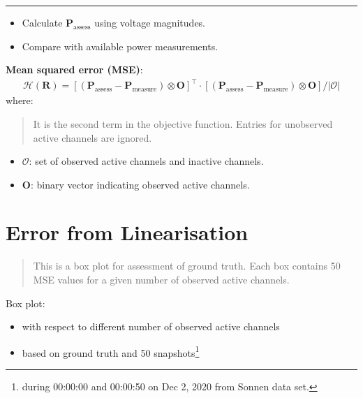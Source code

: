 \documentclass[
]{book}
\providecommand{\tightlist}{%
  \setlength{\itemsep}{0pt}\setlength{\parskip}{0pt}}
\begin{document}
\begin{center}\rule{0.5\linewidth}{0.5pt}\end{center}

\begin{itemize}
\tightlist
\item
  Calculate \(\boldsymbol{P}_\text{assess}\) using voltage magnitudes.
\item
  Compare with available power measurements.
\end{itemize}

\textbf{Mean squared error (MSE)}:
\[ \begin{aligned}
  \mathcal{H}(\boldsymbol{R}) =
  \left[
    (\boldsymbol{P}_\text{assess} - \boldsymbol{P}_\text{measure})
    \otimes \boldsymbol{O}
  \right]^\top
  \cdot \left[
    (\boldsymbol{P}_\text{assess} - \boldsymbol{P}_\text{measure})
    \otimes \boldsymbol{O}
  \right]
  / |\mathcal{O}|
\end{aligned} \]
where:

\begin{quote}
It is the second term in the objective function. Entries for unobserved
active channels are ignored.
\end{quote}

\begin{itemize}
\tightlist
\item
  \(\mathcal{O}\): set of observed active channels and inactive channels.
\item
  \(\boldsymbol{O}\): binary vector indicating observed active channels.
\end{itemize}

\hypertarget{error}{%
\section{Error from Linearisation}\label{error}}

\begin{quote}
This is a box plot for assessment of ground truth. Each box contains 50 MSE
values for a given number of observed active channels.
\end{quote}

Box plot:

\begin{itemize}
\tightlist
\item
  with respect to different number of observed active channels
\item
  based on ground truth and 50 snapshots\footnote{during 00:00:00 and 00:00:50 on Dec
    2, 2020 from Sonnen data set.}
\end{itemize}
\end{document}
